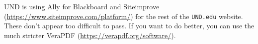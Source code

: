 \documentclass{article}
\begin{document}
UND is using Ally for Blackboard and Siteimprove (\url{https://www.siteimprove.com/platform/}) for the rest of the \texttt{UND.edu} website.  These don't appear too difficult to pass.  If you want to do better, you can use the much stricter VeraPDF (\url{https://verapdf.org/software/}).

\end{document}
